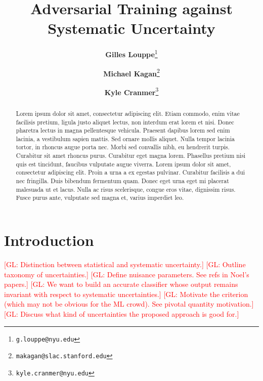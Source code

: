 \documentclass[twocolumn,superscriptaddress,aps]{revtex4-1}
\newcommand{\glnote}[1]{\textcolor{red}{[GL: #1]}}
\theoremstyle{plain}
\begin{document}

\title{\Large{Adversarial Training against Systematic Uncertainty}}
\vspace{1cm}
\author{\small{\bf Gilles Louppe}\thanks{\texttt{g.louppe@nyu.edu}}}
\author{\small{\bf Michael Kagan}\thanks{\texttt{makagan@slac.stanford.edu}}}
\author{\small{\bf Kyle Cranmer}\thanks{\texttt{kyle.cranmer@nyu.edu}}}

\begin{abstract}

Lorem ipsum dolor sit amet, consectetur adipiscing elit. Etiam commodo, enim
vitae facilisis pretium, ligula justo aliquet lectus, non interdum erat lorem et
nisi. Donec pharetra lectus in magna pellentesque vehicula. Praesent dapibus
lorem sed enim lacinia, a vestibulum sapien mattis. Sed ornare mollis aliquet.
Nulla tempor lacinia tortor, in rhoncus augue porta nec. Morbi sed convallis
nibh, eu hendrerit turpis. Curabitur sit amet rhoncus purus. Curabitur eget
magna lorem. Phasellus pretium nisi quis est tincidunt, faucibus vulputate augue
viverra. Lorem ipsum dolor sit amet, consectetur adipiscing elit. Proin a urna a
ex egestas pulvinar. Curabitur facilisis a dui nec fringilla. Duis bibendum
fermentum quam. Donec eget urna eget mi placerat malesuada ut et lacus. Nulla ac
risus scelerisque, congue eros vitae, dignissim risus. Fusce purus ante,
vulputate sed magna et, varius imperdiet leo.

\end{abstract}

\maketitle



\section{Introduction}

\glnote{Distinction between statistical and systematic uncertainty.}
\glnote{Outline taxonomy of uncertainties.}
\glnote{Define nuisance parameters. See refs in Noel's papers.}
\glnote{We want to build an accurate classifier whose output remains invariant with
respect to systematic uncertainties.}
\glnote{Motivate the criterion (which may not be obvious for the ML crowd). See pivotal quantity motivation.}
\glnote{Discuss what kind of uncertainties the proposed approach is good for.}
\end{document}
